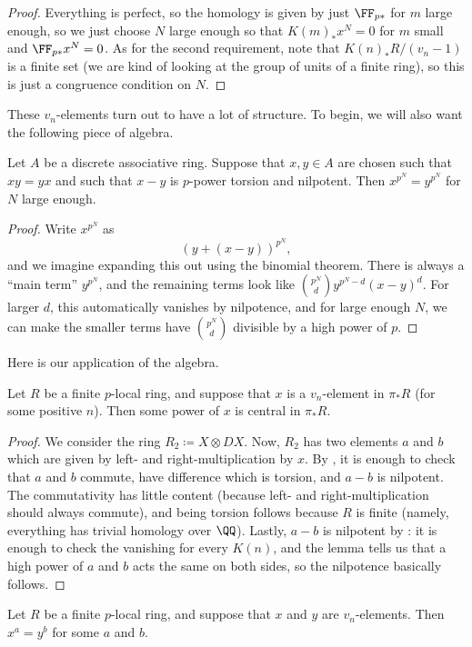 \documentclass[../notes.tex]{subfiles}
\begin{document}
\begin{proof}
	Everything is perfect, so the homology is given by just $\FF_{p*}$ for $m$ large enough, so we just choose $N$ large enough so that $K(m)_*x^N=0$ for $m$ small and $\FF_{p*}x^N=0$. As for the second requirement, note that $K(n)_*R/(v_n-1)$ is a finite set (we are kind of looking at the group of units of a finite ring), so this is just a congruence condition on $N$.
\end{proof}
These $v_n$-elements turn out to have a lot of structure. To begin, we will also want the following piece of algebra.
\begin{lemma} \label{lem:get-powers-equal}
	Let $A$ be a discrete associative ring. Suppose that $x,y\in A$ are chosen such that $xy=yx$ and such that $x-y$ is $p$-power torsion and nilpotent. Then $x^{p^N}=y^{p^N}$ for $N$ large enough.
\end{lemma}
\begin{proof}
	Write $x^{p^N}$ as
	\[(y+(x-y))^{p^N},\]
	and we imagine expanding this out using the binomial theorem. There is always a ``main term'' $y^{p^N}$, and the remaining terms look like $\binom{p^N}dy^{p^N-d}(x-y)^d$. For larger $d$, this automatically vanishes by nilpotence, and for large enough $N$, we can make the smaller terms have $\binom{p^N}d$ divisible by a high power of $p$.
\end{proof}
Here is our application of the algebra.
\begin{lemma} \label{lem:high-power-commutes}
	Let $R$ be a finite $p$-local ring, and suppose that $x$ is a $v_n$-element in $\pi_*R$ (for some positive $n$). Then some power of $x$ is central in $\pi_*R$.
\end{lemma}
\begin{proof}
	We consider the ring $R_2\coloneqq X\otimes DX$. Now, $R_2$ has two elements $a$ and $b$ which are given by left- and right-multiplication by $x$. By , it is enough to check that $a$ and $b$ commute, have difference which is torsion, and $a-b$ is nilpotent. The commutativity has little content (because left- and right-multiplication should always commute), and being torsion follows because $R$ is finite (namely, everything has trivial homology over $\QQ$). Lastly, $a-b$ is nilpotent by : it is enough to check the vanishing for every $K(n)$, and the lemma tells us that a high power of $a$ and $b$ acts the same on both sides, so the nilpotence basically follows.
\end{proof}
\begin{proposition} \label{prop:vn-powers}
	Let $R$ be a finite $p$-local ring, and suppose that $x$ and $y$ are $v_n$-elements. Then $x^a=y^b$ for some $a$ and $b$.
\end{proposition}
\end{document}
